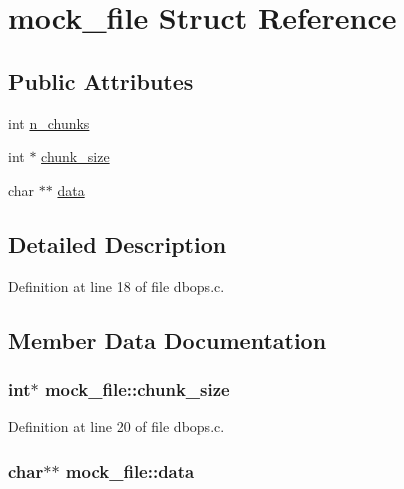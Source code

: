 \hypertarget{structmock__file}{\section{mock\-\_\-file Struct Reference}
\label{structmock__file}
}
\subsection*{Public Attributes}
\begin{DoxyCompactItemize}
\item 
int \hyperlink{structmock__file_a18485ea7673b7336615d1a47ce8169eb}{n\-\_\-chunks}
\item 
int $\ast$ \hyperlink{structmock__file_af9e3c42975e1019a49350ee67d333640}{chunk\-\_\-size}
\item 
char $\ast$$\ast$ \hyperlink{structmock__file_ad60565b8d3cf1ee0c860031f7a72c899}{data}
\end{DoxyCompactItemize}


\subsection{Detailed Description}


Definition at line 18 of file dbops.\-c.



\subsection{Member Data Documentation}
\hypertarget{structmock__file_af9e3c42975e1019a49350ee67d333640}{
\subsubsection[{chunk\-\_\-size}]{\setlength{\rightskip}{0pt plus 5cm}int$\ast$ mock\-\_\-file\-::chunk\-\_\-size}}\label{structmock__file_af9e3c42975e1019a49350ee67d333640}


Definition at line 20 of file dbops.\-c.

\hypertarget{structmock__file_ad60565b8d3cf1ee0c860031f7a72c899}{
\subsubsection[{data}]{\setlength{\rightskip}{0pt plus 5cm}char$\ast$$\ast$ mock\-\_\-file\-::data}}\label{structmock__file_ad60565b8d3cf1ee0c860031f7a72c899}


